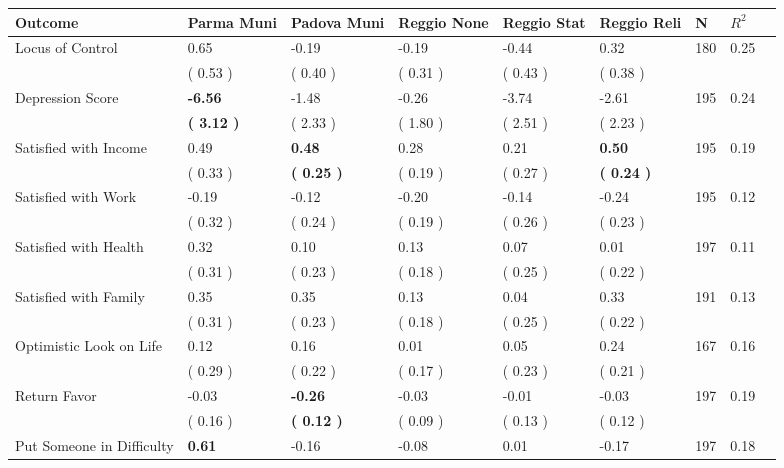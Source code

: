 \begin{tabular}{L{6.2cm} C{1.8cm} C{1.8cm} C{1.8cm} C{1.8cm} C{1.8cm} C{1.8cm} C{0.3cm} C{0.3cm}}
\toprule
 \textbf{Outcome} & \textbf{Parma Muni} & \textbf{Padova Muni} & \textbf{Reggio None} & \textbf{Reggio Stat} & \textbf{Reggio Reli} & \textbf{N} & \textbf{$ R^2$} \\
\midrule
Locus of Control &      0.65 &     -0.19 &     -0.19 &     -0.44 &      0.32  & 180 &       0.25 \\ 
 & (     0.53 ) & (     0.40 ) & (     0.31 ) & (     0.43 ) & (     0.38 )  & \\
Depression Score & \textbf{    -6.56} &     -1.48 &     -0.26 &     -3.74 &     -2.61  & 195 &       0.24 \\ 
 & \textbf{(     3.12 )} & (     2.33 ) & (     1.80 ) & (     2.51 ) & (     2.23 )  & \\
Satisfied with Income &      0.49 & \textbf{     0.48} &      0.28 &      0.21 & \textbf{     0.50}  & 195 &       0.19 \\ 
 & (     0.33 ) & \textbf{(     0.25 )} & (     0.19 ) & (     0.27 ) & \textbf{(     0.24 )}  & \\
Satisfied with Work &     -0.19 &     -0.12 &     -0.20 &     -0.14 &     -0.24  & 195 &       0.12 \\ 
 & (     0.32 ) & (     0.24 ) & (     0.19 ) & (     0.26 ) & (     0.23 )  & \\
Satisfied with Health &      0.32 &      0.10 &      0.13 &      0.07 &      0.01  & 197 &       0.11 \\ 
 & (     0.31 ) & (     0.23 ) & (     0.18 ) & (     0.25 ) & (     0.22 )  & \\
Satisfied with Family &      0.35 &      0.35 &      0.13 &      0.04 &      0.33  & 191 &       0.13 \\ 
 & (     0.31 ) & (     0.23 ) & (     0.18 ) & (     0.25 ) & (     0.22 )  & \\
Optimistic Look on Life &      0.12 &      0.16 &      0.01 &      0.05 &      0.24  & 167 &       0.16 \\ 
 & (     0.29 ) & (     0.22 ) & (     0.17 ) & (     0.23 ) & (     0.21 )  & \\
Return Favor &     -0.03 & \textbf{    -0.26} &     -0.03 &     -0.01 &     -0.03  & 197 &       0.19 \\ 
 & (     0.16 ) & \textbf{(     0.12 )} & (     0.09 ) & (     0.13 ) & (     0.12 )  & \\
Put Someone in Difficulty & \textbf{     0.61} &     -0.16 &     -0.08 &      0.01 &     -0.17  & 197 &       0.18 \\ 

\end{tabular}
